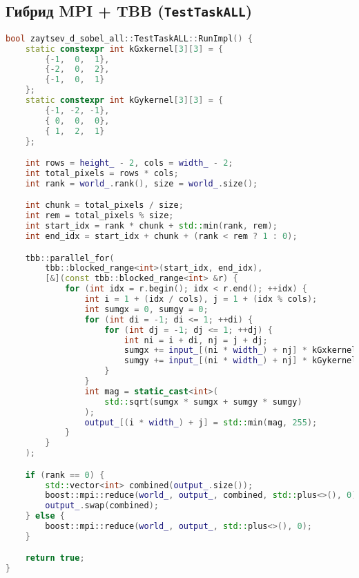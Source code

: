 \documentclass[12pt]{article}
\begin{document}
\subsection{Гибрид MPI + TBB (\texttt{TestTaskALL})}

\begin{lstlisting}[language=C++, caption={Гибридная реализация MPI + TBB}]
bool zaytsev_d_sobel_all::TestTaskALL::RunImpl() {
    static constexpr int kGxkernel[3][3] = {
        {-1,  0,  1},
        {-2,  0,  2},
        {-1,  0,  1}
    };
    static constexpr int kGykernel[3][3] = {
        {-1, -2, -1},
        { 0,  0,  0},
        { 1,  2,  1}
    };

    int rows = height_ - 2, cols = width_ - 2;
    int total_pixels = rows * cols;
    int rank = world_.rank(), size = world_.size();

    int chunk = total_pixels / size;
    int rem = total_pixels % size;
    int start_idx = rank * chunk + std::min(rank, rem);
    int end_idx = start_idx + chunk + (rank < rem ? 1 : 0);

    tbb::parallel_for(
        tbb::blocked_range<int>(start_idx, end_idx),
        [&](const tbb::blocked_range<int> &r) {
            for (int idx = r.begin(); idx < r.end(); ++idx) {
                int i = 1 + (idx / cols), j = 1 + (idx % cols);
                int sumgx = 0, sumgy = 0;
                for (int di = -1; di <= 1; ++di) {
                    for (int dj = -1; dj <= 1; ++dj) {
                        int ni = i + di, nj = j + dj;
                        sumgx += input_[(ni * width_) + nj] * kGxkernel[di+1][dj+1];
                        sumgy += input_[(ni * width_) + nj] * kGykernel[di+1][dj+1];
                    }
                }
                int mag = static_cast<int>(
                    std::sqrt(sumgx * sumgx + sumgy * sumgy)
                );
                output_[(i * width_) + j] = std::min(mag, 255);
            }
        }
    );

    if (rank == 0) {
        std::vector<int> combined(output_.size());
        boost::mpi::reduce(world_, output_, combined, std::plus<>(), 0);
        output_.swap(combined);
    } else {
        boost::mpi::reduce(world_, output_, std::plus<>(), 0);
    }

    return true;
}
\end{lstlisting}
\end{document}
